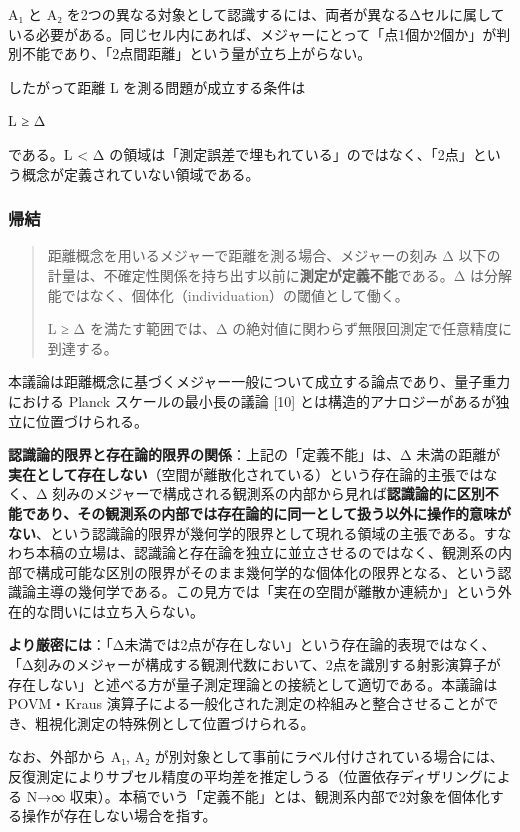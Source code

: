 \documentclass[
]{ltjsarticle}
\begin{document}
A₁ と A₂
を2つの異なる対象として認識するには、両者が異なるΔセルに属している必要がある。同じセル内にあれば、メジャーにとって「点1個か2個か」が判別不能であり、「2点間距離」という量が立ち上がらない。

したがって距離 L を測る問題が成立する条件は

L ≥ Δ

である。L \textless{} Δ
の領域は「測定誤差で埋もれている」のではなく、「2点」という概念が定義されていない領域である。

\subsubsection{帰結}\label{ux5e30ux7d50}

\begin{quote}
距離概念を用いるメジャーで距離を測る場合、メジャーの刻み Δ
以下の計量は、不確定性関係を持ち出す以前に\textbf{測定が定義不能}である。Δ
は分解能ではなく、個体化（individuation）の閾値として働く。

L ≥ Δ を満たす範囲では、Δ
の絶対値に関わらず無限回測定で任意精度に到達する。
\end{quote}

本議論は距離概念に基づくメジャー一般について成立する論点であり、量子重力における
Planck スケールの最小長の議論 {[}10{]}
とは構造的アナロジーがあるが独立に位置づけられる。

\textbf{認識論的限界と存在論的限界の関係}：上記の「定義不能」は、Δ
未満の距離が\textbf{実在として存在しない}（空間が離散化されている）という存在論的主張ではなく、Δ
刻みのメジャーで構成される観測系の内部から見れば\textbf{認識論的に区別不能であり、その観測系の内部では存在論的に同一として扱う以外に操作的意味がない}、という認識論的限界が幾何学的限界として現れる領域の主張である。すなわち本稿の立場は、認識論と存在論を独立に並立させるのではなく、観測系の内部で構成可能な区別の限界がそのまま幾何学的な個体化の限界となる、という認識論主導の幾何学である。この見方では「実在の空間が離散か連続か」という外在的な問いには立ち入らない。

\textbf{より厳密には}：「Δ未満では2点が存在しない」という存在論的表現ではなく、「Δ刻みのメジャーが構成する観測代数において、2点を識別する射影演算子が存在しない」と述べる方が量子測定理論との接続として適切である。本議論は
POVM・Kraus
演算子による一般化された測定の枠組みと整合させることができ、粗視化測定の特殊例として位置づけられる。

なお、外部から A₁, A₂
が別対象として事前にラベル付けされている場合には、反復測定によりサブセル精度の平均差を推定しうる（位置依存ディザリングによる
N→∞
収束）。本稿でいう「定義不能」とは、観測系内部で2対象を個体化する操作が存在しない場合を指す。
\end{document}
